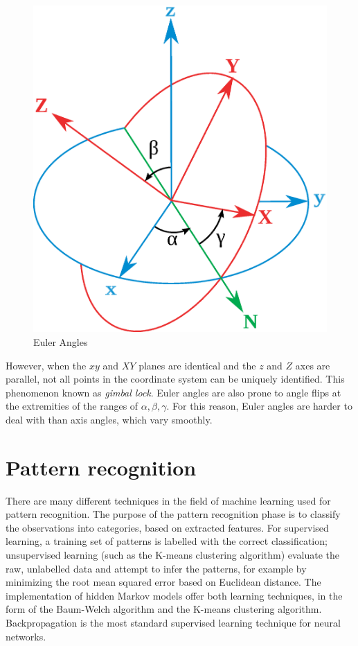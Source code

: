 \documentclass[12pt,a4,notitlepage]{report}
\renewcommand{\_}{\texttt{\symbol{95}}}
\newcommand{\<}{\texttt{\symbol{60}}}
\renewcommand{\>}{\texttt{\symbol{62}}}
\begin{document}
\begin{figure}
\centering
\includegraphics[scale=0.2,angle=0]{diagrams/eulerangles.ps}
\caption{Euler Angles\cite{eulerangles}}
\label{eulerangles}
\end{figure}

However, when the $xy$ and $XY$ planes are identical and the $z$ and $Z$ axes are parallel, not all points in the coordinate system can be uniquely identified. This phenomenon known as {\em gimbal lock}. Euler angles are also prone to angle flips at the extremities of the ranges of $\alpha,\beta,\gamma$. For this reason, Euler angles are harder to deal with than axis angles, which vary smoothly.

\section{Pattern recognition}

There are many different techniques in the field of machine learning used for pattern recognition. The purpose of the pattern recognition phase is to classify the observations into categories, based on extracted features. For supervised learning, a training set of patterns is labelled with the correct classification; unsupervised learning (such as the K-means clustering algorithm) evaluate the raw, unlabelled data and attempt to infer the patterns, for example by minimizing the root mean squared error based on Euclidean distance. The implementation of hidden Markov models offer both learning techniques, in the form of the Baum-Welch algorithm and the K-means clustering algorithm. Backpropagation is the most standard supervised learning technique for neural networks.
\end{document}
